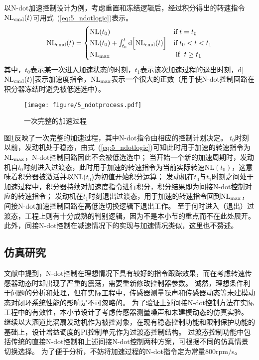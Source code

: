 \documentclass{article}
\begin{document}
以N-dot加速控制设计为例，考虑重置和冻结逻辑后，经过积分得出的转速指令${\rm NL_{cmd}}(t)$可用式~(\ref{eq:5_ndotlogic})表示。
\begin{equation}
{\rm NL_{cmd}}(t)=\begin{cases}
{\rm{NL}}(t_0) & \text{\rm{if}}\; t = t_0\\
{\rm NL}(t_0)+\int_{t_0}^{t} {\rm d} \Big [ {\rm {NL_{cmd}}}(t) \Big ] & \text{\rm{if}}\; t_0 < t < t_1\\
{\rm NL_{max}}  & \text{ \rm{if} }\; t \geq t_1\\
\end{cases}
\label{eq:5_ndotlogic}
\end{equation}
其中，$t_0$表示某一次进入加速状态的时刻，$t_1$表示该次加速过程的退出时刻，d[${\rm {NL_{cmd}}}(t)$]表示加速度指令，${\rm NL_{max}}$表示一个很大的正数（用于使N-dot控制回路在积分器冻结时避免被低选选中）。

\begin{figure}[!ht]
    \centering
    \texttt{[image: figure/5\_ndotprocess.pdf]}
    \caption{一次完整的加速过程}
    \label{fig:5_ndotprocess}
\end{figure}
图\ref{fig:5_ndotprocess}反映了一次完整的加速过程，其中N-dot指令由相应的控制计划决定。
$t_0$时刻以前，发动机处于稳态，由式~(\ref{eq:5_ndotlogic})可知此时用于加速的转速指令为$\rm{NL_{max}}$，N-dot控制回路因此不会被低选选中；
当开始一个新的加速周期时，发动机自$t_0$时刻进入过渡态，此时用于加速的转速指令为当前实际转速NL$(t_0)$，这意味着积分器被激活并以NL($t_0$)为初值开始积分运算；
发动机在$t_0$与$t_1$时刻之间处于加速过程中，积分器持续对加速度指令进行积分，积分结果即为间接N-dot控制对应的转速指令；
发动机在$t_1$时刻退出过渡态，用于加速的转速指令回到$\rm{NL_{max}}$，间接N-dot加速控制回路在高低选切换逻辑下退出工作。
至于何时进入（退出）过渡态，工程上则有十分成熟的判别逻辑，因为不是本小节的重点而不在此处展开。
此外，间接N-dot控制在减速情况下的实现与加速情况类似，这里也不赘述。

\subsection{仿真研究}
\label{sec:5_ndotsim}

文献\cite{Dang2015}中提到，N-dot控制在理想情况下具有较好的指令跟踪效果，而在考虑转速传感器动态时却出现了严重的震荡，需要重新修改控制器参数。
诚然，理想条件利于问题的分析和处理，但在实际工程中，传感器测量噪声和传感器动态等未建模动态对闭环系统性能的影响是不可忽略的。
为了验证上述间接N-dot控制方法在实际工程中的有效性，本小节设计了考虑传感器测量噪声和未建模动态的仿真实验。
继续以大涵道比涡扇发动机作为被控对象，在现有稳态控制功能和限制保护功能的基础上，设计增益调度的PI控制单元作为过渡态控制结构。
过渡态控制功能中包括传统的直接N-dot控制和上述间接N-dot控制两种方案，可根据不同的仿真情景切换选择。
为了便于分析，不妨将加速过程的N-dot指令定为常量800rpm/s。
\end{document}

